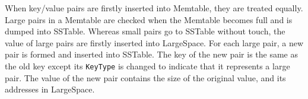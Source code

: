 When key/value pairs are firstly inserted into Memtable, they are
treated equally. Large pairs in a Memtable are checked when the
Memtable becomes full and is dumped into SSTable. Whereas small pairs
go to SSTable without touch, the value of large pairs are firstly
inserted into LargeSpace. For each large pair, a new pair is formed
and inserted into SSTable. The key of the new pair is the same as the
old key except its \texttt{KeyType} is changed to indicate that it
represents a large pair.  The value of the new pair contains the size
of the original value, and its addresses in LargeSpace.

